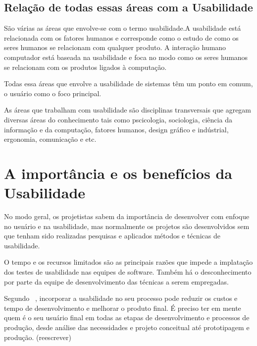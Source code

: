 

\subsection{Relação de todas essas áreas com a Usabilidade}

	São várias as áreas que envolve-se com o termo usabilidade.A usabilidade está relacionada com os fatores humanos e corresponde como o estudo de como os seres humanos se relacionam com qualquer produto. A interação humano computador está baseada na usabilidade e foca no modo como os seres humanos se relacionam com os produtos ligados à computação.

	Todas essa áreas que envolve a usabilidade de sistemas têm um ponto em comum, o usuário como o foco principal.

	As áreas que trabalham com usabilidade são disciplinas transversais que agregam diversas áreas do conhecimento tais como pscicologia, sociologia, ciência da informação e da computação, fatores humanos, design gráfico e indústrial, ergonomia, comunicação e etc.

	 

\section{A importância e os benefícios da Usabilidade}

No modo geral, os projetistas sabem da importância de desenvolver com enfoque no usuário e na usabilidade, mas normalmente os projetos são desenvolvidos sem que tenham sido realizadas pesquisas e aplicados métodos e técnicas de usabilidade.
	
	O tempo e os recursos limitados são as principais razões que impede a implatação dos testes de usabilidade nas equipes de software. Também há o desconhecimento por parte da equipe de desenvolvimento das técnicas a serem empregadas.

	Segundo ~, incorporar a usabilidade no seu processo pode reduzir os custos e tempo de desenvolvimento e melhorar o produto final. É preciso ter em mente quem é o seu usuário final em todas as etapas de desenvolvimento e processos de produção, desde análise das necessidades e projeto conceitual até prototipagem e produção.  (reescrever)

